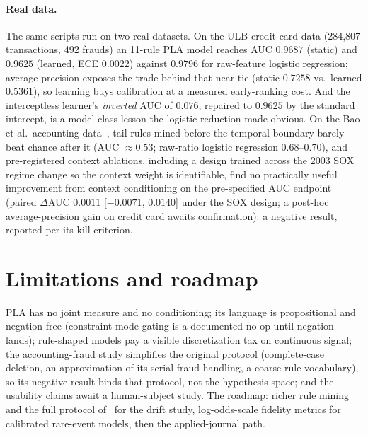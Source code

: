 \documentclass[10pt]{article}
\begin{document}
\paragraph{Real data.} The same scripts run on two real datasets. On the
ULB credit-card data (284{,}807 transactions, 492 frauds) an 11-rule PLA
model reaches AUC $0.9687$ (static) and $0.9625$ (learned, ECE $0.0022$)
against $0.9796$ for raw-feature logistic regression; average precision
exposes the trade behind that near-tie (static $0.7258$ vs.\ learned
$0.5361$), so learning buys calibration at a measured early-ranking
cost. And the
interceptless learner's \emph{inverted} AUC of $0.076$, repaired to
$0.9625$ by the standard intercept, is a model-class lesson the logistic
reduction made obvious. On the Bao et al.\ accounting data~\cite{bao2020},
tail rules mined before the temporal boundary barely beat chance after it
(AUC $\approx 0.53$; raw-ratio logistic regression $0.68$--$0.70$), and
pre-registered context ablations, including a design trained across
the 2003 SOX regime change so the context weight is identifiable,
find no practically useful improvement from context conditioning on
the pre-specified AUC endpoint (paired $\Delta$AUC $0.0011$
[$-0.0071$, $0.0140$] under the SOX design; a post-hoc
average-precision gain on credit card awaits confirmation): a
negative result, reported per its kill criterion.

\section{Limitations and roadmap}
PLA has no joint measure and no conditioning; its language is
propositional and negation-free (constraint-mode gating is a documented
no-op until negation lands); rule-shaped models pay a visible
discretization tax on continuous signal; the accounting-fraud study
simplifies the original protocol (complete-case deletion, an
approximation of its serial-fraud handling, a coarse rule vocabulary),
so its negative result binds that protocol, not the hypothesis space; and the usability claims
await a human-subject study. The roadmap: richer rule mining and the
full protocol of~\cite{bao2020} for the drift study, log-odds-scale
fidelity metrics for calibrated rare-event models, then the
applied-journal path.
\end{document}

